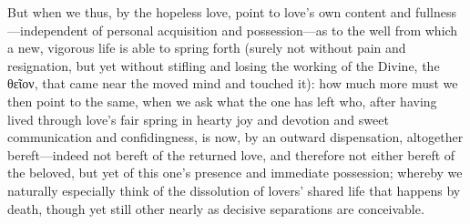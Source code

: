\documentclass[12pt,a4paper]{book}
\begin{document}
But when we thus, by the hopeless love, point to love's own content and
fullness---independent of personal acquisition and possession---as to the
well from which a new, vigorous life is able to spring forth (surely not
without pain and resignation, but yet without stifling and losing the
working of the Divine, the θεῖον, that came near the moved mind and touched
it): how much more must we then point to the same, when we ask what the one
has left who, after having lived through love's fair spring in hearty joy
and devotion and sweet communication and confidingness, is now, by an
outward dispensation, altogether bereft---indeed not bereft of the returned
love, and therefore not either bereft of the beloved, but yet of this one's
presence and immediate possession; whereby we naturally especially think of
the dissolution of lovers' shared life that happens by death, though yet
still other nearly as decisive separations are conceivable.
\end{document}
